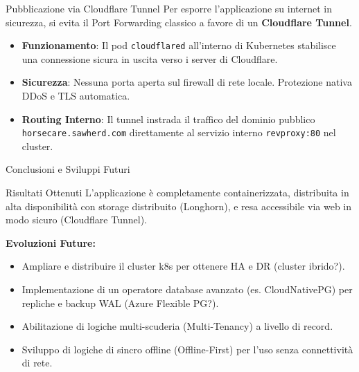 \documentclass[aspectratio=169]{beamer}
\begin{document}
\begin{frame}{Pubblicazione via Cloudflare Tunnel}
    Per esporre l'applicazione su internet in sicurezza, si evita il Port Forwarding classico a favore di un \textbf{Cloudflare Tunnel}.
    \begin{itemize}
        \item \textbf{Funzionamento}: Il pod \texttt{cloudflared} all'interno di Kubernetes stabilisce una connessione sicura in uscita verso i server di Cloudflare.
        \item \textbf{Sicurezza}: Nessuna porta aperta sul firewall di rete locale. Protezione nativa DDoS e TLS automatica.
        \item \textbf{Routing Interno}: Il tunnel instrada il traffico del dominio pubblico \texttt{horsecare.sawherd.com} direttamente al servizio interno \texttt{revproxy:80} nel cluster.
    \end{itemize}
\end{frame}

\begin{frame}{Conclusioni e Sviluppi Futuri}
    \begin{block}{Risultati Ottenuti}
        L'applicazione è completamente containerizzata, distribuita in alta disponibilità con storage distribuito (Longhorn), e resa accessibile via web in modo sicuro (Cloudflare Tunnel).
    \end{block}
    \textbf{Evoluzioni Future:}
    \begin{itemize}
        \item Ampliare e distribuire il cluster k8s per ottenere HA e DR (cluster ibrido?).
        \item Implementazione di un operatore database avanzato (es. CloudNativePG) per repliche e backup WAL (Azure Flexible PG?).
        \item Abilitazione di logiche multi-scuderia (Multi-Tenancy) a livello di record.
        \item Sviluppo di logiche di sincro offline (Offline-First) per l'uso senza connettività di rete.
    \end{itemize}
\end{frame}
\end{document}
